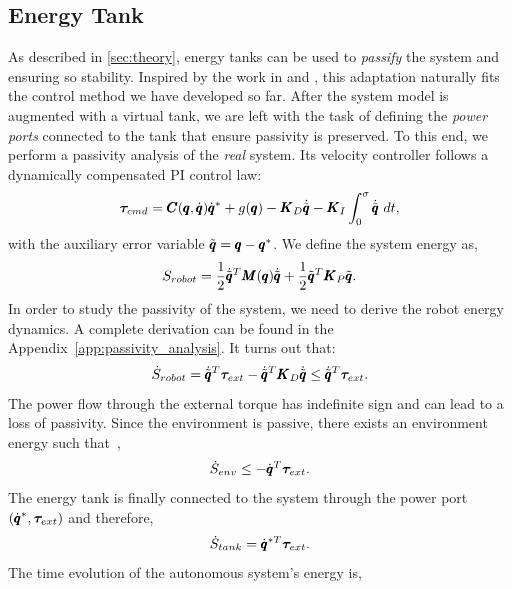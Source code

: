 \subsection{Energy Tank}
As described in \sect \ref{sec:theory}, energy tanks can be used to \emph{passify} the system and ensuring so stability. Inspired by the work in \cite{benzi2021optimization} and \cite{shahriari2018valve}, this adaptation naturally fits the control method we have developed so far. After the system model is augmented with a virtual tank, we are left with the task of defining the \emph{power ports} connected to the tank that ensure passivity is preserved. To this end, we perform a passivity analysis of the \emph{real} system. Its 
velocity controller follows a dynamically compensated PI control law:
\begin{equation}
\commandTorque = \coriolis \dconfigRobotDesired + g(\configRobot) - \matr{K}_D \dconfigRobotError - \matr{K}_I \int_{0}^{\sigma} \dconfigRobotError\ dt,
\end{equation}
with the auxiliary error variable $\tilde{\pmb{q}} =  \pmb{q} - \pmb{q}^*$. We define the system energy as, 
\begin{equation}
    S_{robot} = \frac{1}{2} \dot{\tilde{\pmb{q}}}^T \pmb{M}(\pmb{q}) \dot{\tilde{\pmb{q}}} + \frac{1}{2} \tilde{\pmb{q}}^T \pmb{K}_P \tilde{\pmb{q}}.
\end{equation}
In order to study the passivity of the system, we need to derive the robot energy dynamics. A complete derivation can be found in the Appendix~\ref{app:passivity_analysis}. It turns out that:
\begin{equation}
    \dot{S}_{robot} = \dot{\tilde{\pmb{q}}}^T \boldsymbol{\tau}_{ext} - \dot{\tilde{\pmb{q}}}^T \pmb{K}_D \dot{\tilde{\pmb{q}}} \leq \dot{\tilde{\pmb{q}}}^T \boldsymbol{\tau}_{ext}. 
\end{equation}
The power flow through the external torque has indefinite sign and can lead to a loss of passivity. Since the environment is passive, there exists an environment energy such that~\cite{shahriari2018valve},
\begin{equation}
    \dot{S}_{env} \leq -\dot{\pmb{q}}^T \boldsymbol{\tau}_{ext}.
\end{equation}
The energy tank is finally connected to the system through the power port $(\dot{\pmb{q}}^*, \boldsymbol{\tau}_{ext})$ and therefore,
\begin{equation} \label{eq:tank_dynamics}
\dot{S}_{tank} = \dot{\pmb{q}}^{*T} \boldsymbol{\tau}_{ext}. 
\end{equation}
The time evolution of the autonomous system's energy is,
